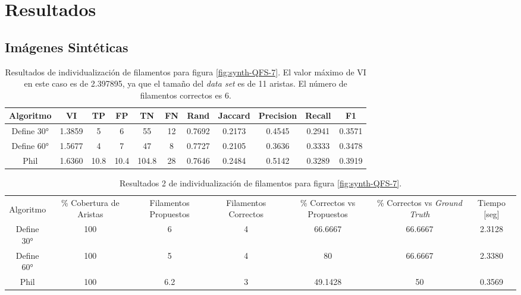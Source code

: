 \chapter{Resultados}
\label{chap:res}

\section{Im\'agenes Sint\'eticas}

\begin{table}[h]
    \centering
    \begin{tabular}{|c|c|c|c|c|c|c|c|c|c|c|}
    \hline
        Algoritmo & VI & TP & FP &TN &FN & Rand	& Jaccard &	Precision &	Recall &	F1 \\ \hline
        Define 30° & 1.3859 & 5 & 6 & 55 & 12 & 0.7692  & 0.2173 & 0.4545 & 0.2941 & 0.3571\\
        Define 60° & 1.5677 & 4 & 7 & 47 & 8  & 0.7727  & 0.2105  & 0.3636  & 0.3333 & 0.3478\\ 
        Phil & 1.6360 & 10.8 & 10.4 & 104.8 & 28 & 0.7646 & 0.2484 & 0.5142 & 0.3289 & 0.3919\\
        \hline
    \end{tabular}
    \caption{Resultados de individualizaci\'on de filamentos para figura \ref{fig:synth-QFS-7}. El valor m\'aximo de VI en este caso es de 2.397895, ya que el tama\~no del {\it data set} es de 11 aristas. El n\'umero de filamentos correctos es 6.}
    \label{tab:synth-QFS-7-Results1}
\end{table}

\begin{table}[h]
    \centering
    \begin{tabular}{|c|c|c|c|c|c|c|}
    \hline
         & \multirow{4}{2cm}{\centering \% Cobertura de Aristas} & \multirow{4}{2cm}{Filamentos Propuestos} & \multirow{4}{2cm}{Filamentos Correctos} & \multirow{4}{2.5cm}{\% Correctos vs Propuestos} & \multirow{4}{2.5cm}{\centering \% Correctos vs {\it Ground Truth}} & \multirow{4}{1.2cm}{\centering Tiempo [seg]} \\
         &  &  &  & & &  \\
        Algoritmo &  &  &  & & &  \\
        &  &  &  & & &  \\ \hline
        Define 30° & 100 & 6 & 4 & 66.6667 & 66.6667 & 2.3128\\
        Define 60° & 100 & 5 & 4 & 80 & 66.6667 & 2.3380\\ 
        Phil & 100 & 6.2 & 3 & 49.1428 & 50  & 0.3569\\
        \hline
    \end{tabular}
    \caption{Resultados 2 de individualizaci\'on de filamentos para figura \ref{fig:synth-QFS-7}.}
    \label{tab:synth-QFS-7-Results2}
\end{table}


